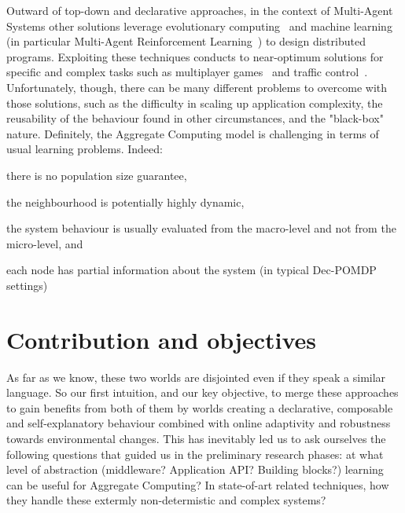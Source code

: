 \documentclass[conference]{IEEEtran}
\begin{document}
Outward of top-down and declarative approaches, in the context of Multi-Agent Systems other solutions leverage evolutionary computing~\cite{DBLP:journals/swarm/BrambillaFBD13} and machine learning (in particular Multi-Agent Reinforcement Learning~\cite{DBLP:journals/tcyb/NguyenNN20}) to design distributed programs.
Exploiting these techniques conducts to near-optimum solutions for specific and complex tasks such as multiplayer games~\cite{DBLP:journals/nature/VinyalsBCMDCCPE19} and traffic control~\cite{DBLP:journals/aes/JinMK17}.
Unfortunately, though, there can be many different problems to overcome with those solutions, such as
the difficulty in scaling up application complexity, the reusability of the behaviour found in other circumstances, and the "black-box" nature. 
%
Definitely, the Aggregate Computing model is challenging in terms of usual learning problems. Indeed:
\begin{enumerate*}[label=(\roman*)]
\item there is no population size guarantee,
\item the neighbourhood is potentially highly dynamic,
\item the system behaviour is usually evaluated from the macro-level and not from the micro-level, and
\item each node has partial information about the system (in typical Dec-POMDP~\cite{DBLP:conf/uai/BernsteinZI00} settings)
\end{enumerate*}
\section{Contribution and objectives}
As far as we know, these two worlds are disjointed even if they speak a similar language. So our first intuition, and our key objective,
to merge these approaches to gain benefits from both of them by worlds creating a declarative, 
composable and self-explanatory behaviour combined with online adaptivity and robustness towards environmental changes.
%
This has inevitably led us to ask ourselves the following questions that guided us in the preliminary research phases: at what level of abstraction (middleware? Application API? Building blocks?) learning can be useful for Aggregate Computing? 
In state-of-art related techniques, how they handle these extermly non-determistic and complex systems?  
%
\end{document}
